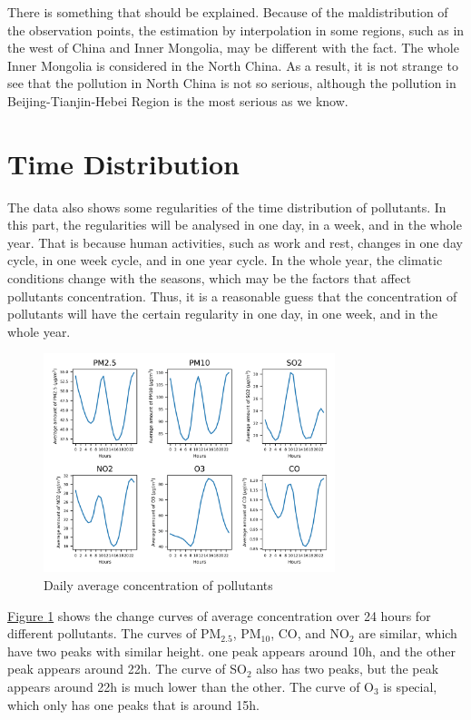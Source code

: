 \documentclass[letterpaper]{article}
\begin{document}
There is something that should be explained. Because of the maldistribution of the observation points, the estimation by interpolation in some regions, such as in the west of China and Inner Mongolia, may be different with the fact. The whole Inner Mongolia is considered in the North China. As a result, it is not strange to see that the pollution in North China is not so serious, although the pollution in Beijing-Tianjin-Hebei Region is the most serious as we know.

\section{Time Distribution}

The data also shows some regularities of the time distribution of pollutants. In this part, the regularities will be analysed in one day, in a week, and in the whole year. That is because human activities, such as work and rest, changes in one day cycle, in one week cycle, and in one year cycle. In the whole year, the climatic conditions change with the seasons, which may be the factors that affect pollutants concentration. Thus, it is a reasonable guess that the concentration of pollutants will have the certain regularity in one day, in one week, and in the whole year.

\begin{figure}[h]
  \includegraphics[width = 8.5cm]{dailyavg_pltn.png}
  \caption{Daily average concentration of pollutants}
  \label{figure:2}
\end{figure}

\hyperref[figure:2]{Figure \ref*{figure:2}} shows the change curves of average concentration over 24 hours for different pollutants. The curves of PM$_{2.5}$, PM$_{10}$, CO, and NO$_{2}$ are similar, which have two peaks with similar height. one peak appears around 10h, and the other peak appears around 22h. The curve of SO$_{2}$ also has two peaks, but the peak appears around 22h is much lower than the other. The curve of O$_{3}$ is special, which only has one peaks that is around 15h.
\end{document}
